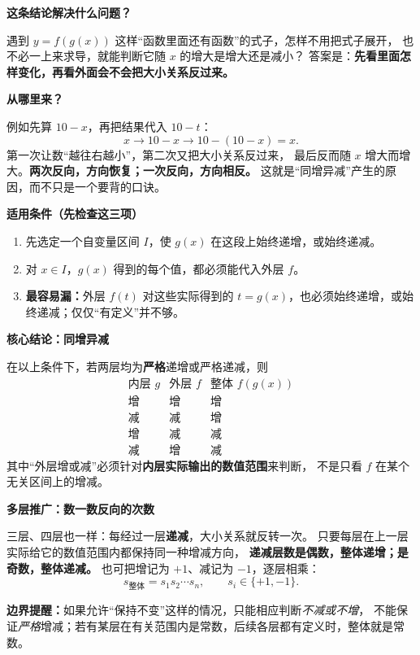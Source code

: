 \begin{statementbox}
\textbf{\textcolor{CStatement}{这条结论解决什么问题？}}

遇到 $y=f(g(x))$ 这样“函数里面还有函数”的式子，怎样不用把式子展开，
也不必一上来求导，就能判断它随 $x$ 的增大是增大还是减小？
答案是：\textbf{先看里面怎样变化，再看外面会不会把大小关系反过来。}

\medskip
\textbf{\textcolor{CStatement}{从哪里来？}}

例如先算 $10-x$，再把结果代入 $10-t$：
\[
 x\longrightarrow 10-x\longrightarrow 10-(10-x)=x.
\]
第一次让数“越往右越小”，第二次又把大小关系反过来，
最后反而随 $x$ 增大而增大。\textbf{两次反向，方向恢复；一次反向，方向相反。}
这就是“同增异减”产生的原因，而不只是一个要背的口诀。

\medskip


\end{statementbox}
\clearpage
\begin{statementbox}
\textbf{\textcolor{CStatement}{适用条件（先检查这三项）}}
\begin{enumerate}[leftmargin=*, itemsep=0.25em]
\item 先选定一个自变量区间 $I$，使 $g(x)$ 在这段上始终递增，或始终递减。
\item 对 $x\in I$，$g(x)$ 得到的每个值，都必须能代入外层 $f$。
\item \textbf{最容易漏：}外层 $f(t)$ 对这些实际得到的 $t=g(x)$，也必须始终递增，或始终递减；仅仅“有定义”并不够。
\end{enumerate}

\textbf{\textcolor{CStatement}{核心结论：同增异减}}

在以上条件下，若两层均为\textbf{严格}递增或严格递减，则
\[
\begin{array}{c|c|c}
\text{内层 }g & \text{外层 }f & \text{整体 }f(g(x))\\ \hline
\text{增} & \text{增} & \text{增}\\
\text{减} & \text{减} & \text{增}\\
\text{增} & \text{减} & \text{减}\\
\text{减} & \text{增} & \text{减}
\end{array}
\]
其中“外层增或减”必须针对\textbf{内层实际输出的数值范围}来判断，
不是只看 $f$ 在某个无关区间上的增减。

\medskip
\textbf{\textcolor{CStatement}{多层推广：数一数反向的次数}}

三层、四层也一样：每经过一层\textbf{递减}，大小关系就反转一次。
只要每层在上一层实际给它的数值范围内都保持同一种增减方向，
\textbf{递减层数是偶数，整体递增；是奇数，整体递减。}
也可把增记为 $+1$、减记为 $-1$，逐层相乘：
\[
 s_{\text{整体}}=s_1s_2\cdots s_n,\qquad s_i\in\{+1,-1\}.
\]

\textbf{边界提醒：}如果允许“保持不变”这样的情况，只能相应判断\emph{不减或不增}，
不能保证\emph{严格}增减；若有某层在有关范围内是常数，后续各层都有定义时，整体就是常数。
\end{statementbox}
